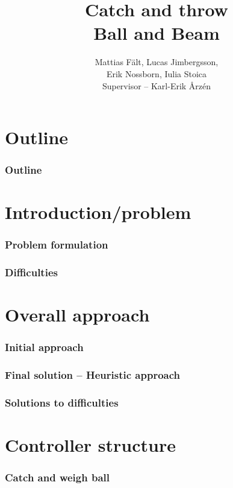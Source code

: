 \documentclass[
compress]
{beamer}
\title[Catch and Throw]{Catch and throw\\Ball and Beam}
\author[]{Mattias Fält, Lucas Jimbergsson,\\Erik Nossborn, Iulia Stoica\\\vspace{1em}Supervisor -- Karl-Erik Årz\'{e}n}
\begin{document}
\frame{\titlepage}

\section*{Outline}


\frame
{
  \frametitle{Outline}
  \tableofcontents[part=1]%
}

\section{Introduction/problem}
\begin{frame}
\frametitle{Problem formulation}

\end{frame}

\begin{frame}
\frametitle{Difficulties}

\end{frame}

\section{Overall approach}
\begin{frame}
\frametitle{Initial approach}

\end{frame}

\begin{frame}
\frametitle{Final solution -- Heuristic approach}

\end{frame}

\begin{frame}
\frametitle{Solutions to difficulties}

\end{frame}

\section{Controller structure}
\begin{frame}
\end{frame}

\begin{frame}
\frametitle{Catch and weigh ball}

\end{frame}
\end{document}

